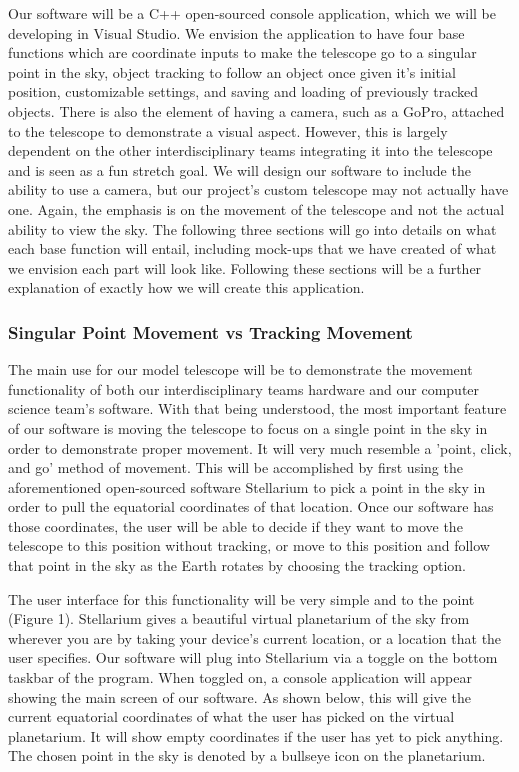 \documentclass[12pt]{report}
\begin{document}
Our software will be a C++ open-sourced console application, which we will be developing in Visual Studio. We envision the application to have four base functions which are coordinate inputs to make the telescope go to a singular point in the sky, object tracking to follow an object once given it's initial position, customizable settings, and saving and loading of previously tracked objects. There is also the element of having a camera, such as a GoPro, attached to the telescope to demonstrate a visual aspect. However, this is largely dependent on the other interdisciplinary teams integrating it into the telescope and is seen as a fun stretch goal. We will design our software to include the ability to use a camera, but our project's custom telescope may not actually have one. Again, the emphasis is on the movement of the telescope and not the actual ability to view the sky. The following three sections will go into details on what each base function will entail, including mock-ups that we have created of what we envision each part will look like. Following these sections will be a further explanation of exactly how we will create this application.

\subsubsection*{Singular Point Movement vs Tracking Movement}

The main use for our model telescope will be to demonstrate the movement functionality of both our interdisciplinary teams hardware and our computer science team's software. With that being understood, the most important feature of our software is moving the telescope to focus on a single point in the sky in order to demonstrate proper movement. It will very much resemble a 'point, click, and go' method of movement. This will be accomplished by first using the aforementioned open-sourced software Stellarium to pick a point in the sky in order to pull the equatorial coordinates of that location. Once our software has those coordinates, the user will be able to decide if they want to move the telescope to this position without tracking, or move to this position and follow that point in the sky as the Earth rotates by choosing the tracking option.

The user interface for this functionality will be very simple and to the point (Figure 1). Stellarium gives a beautiful virtual planetarium of the sky from wherever you are by taking your device's current location, or a location that the user specifies. Our software will plug into Stellarium via a toggle on the bottom taskbar of the program. When toggled on, a console application will appear showing the main screen of our software. As shown below, this will give the current equatorial coordinates of what the user has picked on the virtual planetarium. It will show empty coordinates if the user has yet to pick anything. The chosen point in the sky is denoted by a bullseye icon on the planetarium.
\end{document}
